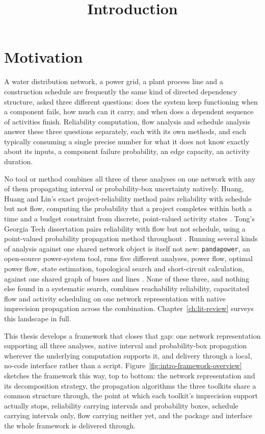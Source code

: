\documentclass[12pt]{report}
\begin{document}
\title{Introduction}
\fi

\section{Motivation}
\label{sec:intro-motivation}

A water distribution network, a power grid, a plant process line and a construction schedule are
frequently the same kind of directed dependency structure, asked three different questions: does
the system keep functioning when a component fails, how much can it carry, and when does a
dependent sequence of activities finish. Reliability computation, flow analysis and schedule
analysis answer these three questions separately, each with its own methods, and each typically
consuming a single precise number for what it does not know exactly about its inputs, a component
failure probability, an edge capacity, an activity duration.

No tool or method combines all three of these analyses on one network with any of them
propagating interval or probability-box uncertainty natively. Huang, Huang and Lin's exact
project-reliability method pairs reliability with schedule but not flow, computing the probability
that a project completes within both a time and a budget constraint from discrete, point-valued
activity states \cite{huang2020exact}. Tong's Georgia Tech dissertation pairs reliability with
flow but not schedule, using a point-valued probability propagation method throughout
\cite{tong2021infrastructure}. Running several kinds of analysis against one shared network object
is itself not new: \texttt{pandapower}, an open-source power-system tool, runs five different
analyses, power flow, optimal power flow, state estimation, topological search and short-circuit
calculation, against one shared graph of buses and lines \cite{thurner2018pandapower}. None of
these three, and nothing else found in a systematic search, combines reachability reliability,
capacitated flow and activity scheduling on one network representation with native imprecision
propagation across the combination. Chapter~\ref{ch:lit-review} surveys this landscape in full.

This thesis develops a framework that closes that gap: one network representation supporting all
three analyses, native interval and probability-box propagation wherever the underlying
computation supports it, and delivery through a local, no-code interface rather than a script.
Figure~\ref{fig:intro-framework-overview} sketches the framework this way, top to bottom: the
network representation and its decomposition strategy, the propagation algorithms the three
toolkits share a common structure through, the point at which each toolkit's imprecision support
actually stops, reliability carrying intervals and probability boxes, schedule carrying intervals
only, flow carrying neither yet, and the package and interface the whole framework is delivered
through.
\end{document}
